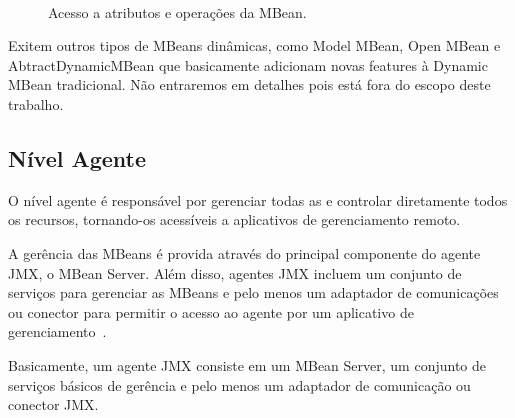 \begin{figure}[htp]
\centering
{}
\\
\caption{Acesso a atributos e operações da MBean.}
\label{fig:requestjmx}
\end{figure}

Exitem outros tipos de MBeans dinâmicas, como Model MBean, Open MBean e AbtractDynamicMBean que basicamente adicionam novas features à Dynamic MBean tradicional. Não entraremos em detalhes pois está fora do escopo deste trabalho.

\subsection{Nível Agente}
O nível agente é responsável por gerenciar todas as e controlar diretamente todos os recursos, tornando-os acessíveis a aplicativos de gerenciamento remoto.

A gerência das MBeans é provida através do principal componente do agente JMX, o MBean Server. Além disso, agentes JMX incluem um conjunto de serviços para gerenciar as MBeans e pelo menos um adaptador de comunicações ou conector para permitir o acesso ao agente por um aplicativo de gerenciamento~\cite{jmx}.

Basicamente, um agente JMX consiste em um MBean Server, um conjunto de serviços básicos de gerência e pelo menos um adaptador de comunicação ou conector JMX.


